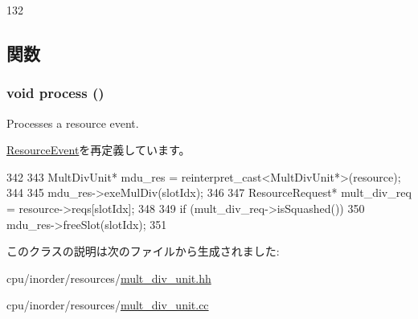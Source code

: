 \begin{DoxyCode}
132 { }
\end{DoxyCode}


\subsection{関数}
\hypertarget{classMDUEvent_a2e9c5136d19b1a95fc427e0852deab5c}{
\subsubsection[{process}]{\setlength{\rightskip}{0pt plus 5cm}void process ()}}
\label{classMDUEvent_a2e9c5136d19b1a95fc427e0852deab5c}
Processes a resource event. 

\hyperlink{classResourceEvent_a2e9c5136d19b1a95fc427e0852deab5c}{ResourceEvent}を再定義しています。


\begin{DoxyCode}
342 {
343     MultDivUnit* mdu_res = reinterpret_cast<MultDivUnit*>(resource);
344 
345     mdu_res->exeMulDiv(slotIdx);
346 
347     ResourceRequest* mult_div_req = resource->reqs[slotIdx];
348 
349     if (mult_div_req->isSquashed())
350         mdu_res->freeSlot(slotIdx);
351 }
\end{DoxyCode}


このクラスの説明は次のファイルから生成されました:\begin{DoxyCompactItemize}
\item 
cpu/inorder/resources/\hyperlink{mult__div__unit_8hh}{mult\_\-div\_\-unit.hh}\item 
cpu/inorder/resources/\hyperlink{mult__div__unit_8cc}{mult\_\-div\_\-unit.cc}\end{DoxyCompactItemize}
